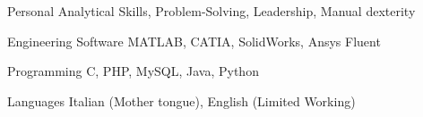 

\begin{cvskills}

  \cvskill
  {Personal} %
  {Analytical Skills, Problem-Solving, Leadership, Manual dexterity} %

  \cvskill
  {Engineering Software} %
  {MATLAB, CATIA, SolidWorks, Ansys Fluent} %

  \cvskill
  {Programming} %
  {C, PHP, MySQL, Java, Python} %

  \cvskill
  {Languages} %
  {Italian (Mother tongue), English (Limited Working)} %

\end{cvskills}
